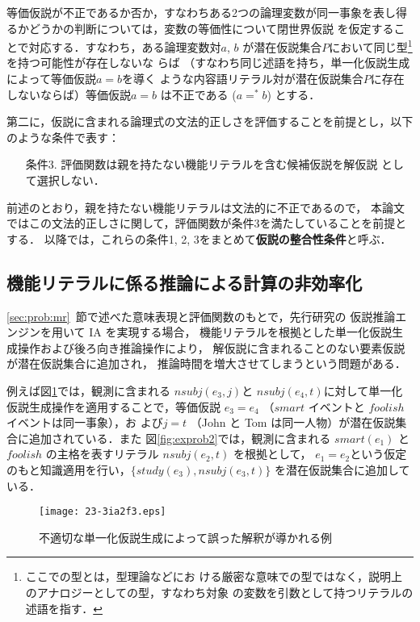 \documentclass[japanese]{jnlp_1.4}
\begin{document}
等価仮説が不正であるか否か，すなわちある2つの論理変数が同一事象を表し得
るかどうかの判断については，変数の等価性について閉世界仮説
\cite{raymond78}を仮定することで対応する．すなわち，ある論理変数対$a$, $b$
が潜在仮説集合$P$において同じ型\footnote{ここでの型とは，型理論などにお
ける厳密な意味での型ではなく，説明上のアナロジーとしての型，すなわち対象
の変数を引数として持つリテラルの述語を指す．}を持つ可能性が存在しないな
らば （すなわち同じ述語を持ち，単一化仮説生成によって等価仮説$a=b$を導く
ような内容語リテラル対が潜在仮説集合$P$に存在しないならば）等価仮説$a=b$
は不正である ($a=^*b$) とする．


第二に，仮説に含まれる論理式の文法的正しさを評価することを前提とし，以下
のような条件で表す：
\begin{itemize}
\item[条件3.] 評価関数は親を持たない機能リテラルを含む候補仮説を解仮説
	      として選択しない．
\end{itemize}
前述のとおり，親を持たない機能リテラルは文法的に不正であるので，
本論文ではこの文法的正しさに関して，評価関数が条件3を満たしていることを前提とする．
以降では，これらの条件1, 2, 3をまとめて\textbf{仮説の整合性条件}と呼ぶ．



\subsection{機能リテラルに係る推論による計算の非効率化}
\label{sec:prob:main}

\ref{sec:prob:mr}~節で述べた意味表現と評価関数のもとで，先行研究の
仮説推論エンジンを用いて IA を実現する場合，
機能リテラルを根拠とした単一化仮説生成操作および後ろ向き推論操作により，
解仮説に含まれることのない要素仮説が潜在仮説集合に追加され，
推論時間を増大させてしまうという問題がある．

例えば図\ref{fig:exprob1}では，観測に含まれる $\mathit{nsubj}(e_3,j)$と
$\mathit{nsubj}(e_4,t)$に対して単一化仮説生成操作を適用することで，等価仮説
$e_3=e_4$ （$\mathit{smart}$ イベントと $\mathit{foolish}$ イベントは同一事象），お
よび$j=t$ （John と Tom は同一人物）が潜在仮説集合に追加されている．また
図\ref{fig:exprob2}では，観測に含まれる $\mathit{smart}(e_1)$ と
$\mathit{foolish}$ の主格を表すリテラル $\mathit{nsubj}(e_2,t)$ を根拠として，
$e_1=e_2$という仮定のもと知識適用を行い，$\{\mathit{study}(e_3), \mathit{nsubj}(e_3,t)\}$
を潜在仮説集合に追加している．

\begin{figure}[b]
\begin{center}
\texttt{[image: 23-3ia2f3.eps]}
\end{center}
\caption{不適切な単一化仮説生成によって誤った解釈が導かれる例}
\label{fig:exprob1}
\end{figure}
\end{document}
